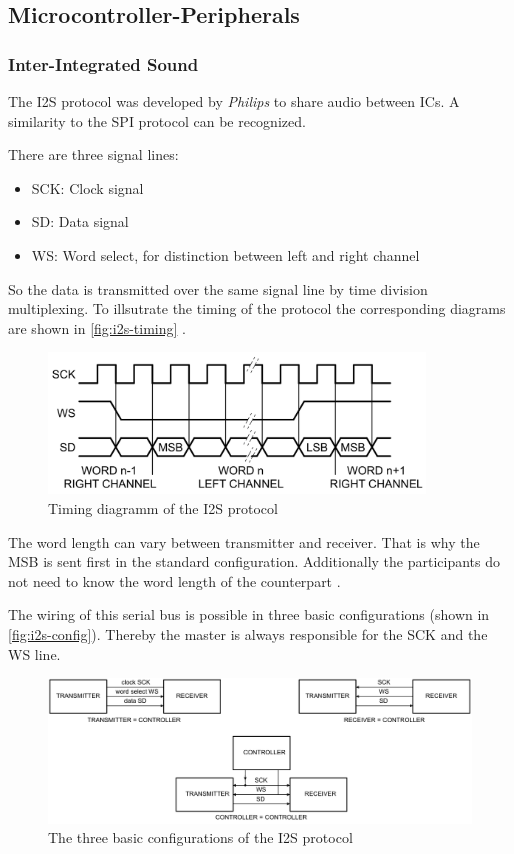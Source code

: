 \subsection{Microcontroller-Peripherals}

\subsubsection{Inter-Integrated Sound}

The \ac{I2S} protocol was developed by \textit{Philips} to share audio between \acp{IC}.
A similarity to the \ac{SPI} protocol can be recognized.

There are three signal lines:
\begin{itemize}
    \item SCK: Clock signal
    \item SD: Data signal
    \item WS: Word select, for distinction between left and right channel
\end{itemize}
So the data is transmitted over the same signal line by time division multiplexing. 
To illsutrate the timing of the protocol the corresponding diagrams are shown in \autoref{fig:i2s-timing} \cite{nxp_i2s}.

\begin{figure}[!h]
    \centering
    \includegraphics[width=10cm]{img/i2s_timing.png}
    \caption{Timing diagramm of the \ac{I2S} protocol \cite{nxp_i2s}}
    \label{fig:i2s-timing}
\end{figure}

The word length can vary between transmitter and receiver. That is why the \ac{MSB} is sent first in the standard 
configuration. Additionally the participants do not need to know the word length of the counterpart \cite{nxp_i2s}.

The wiring of this serial bus is possible in three basic configurations (shown in \autoref{fig:i2s-config}).
Thereby the master is always responsible for the SCK and the WS line.

\begin{figure}[!h]
    \centering
    \includegraphics[width=14cm]{img/i2s_config.png}
    \caption{The three basic configurations of the \ac{I2S} protocol \cite{nxp_i2s}}
    \label{fig:i2s-config}
\end{figure}

